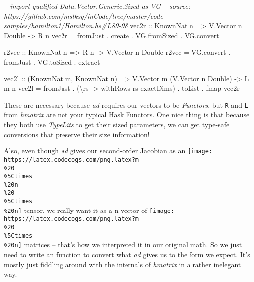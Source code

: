 \documentclass[]{article}
\newenvironment{Shaded}{}{}
\newcommand{\DataTypeTok}[1]{\textcolor[rgb]{0.56,0.13,0.00}{#1}}
\newcommand{\CommentTok}[1]{\textcolor[rgb]{0.38,0.63,0.69}{\textit{#1}}}
\newcommand{\OtherTok}[1]{\textcolor[rgb]{0.00,0.44,0.13}{#1}}
\newcommand{\FunctionTok}[1]{\textcolor[rgb]{0.02,0.16,0.49}{#1}}
\newcommand{\NormalTok}[1]{#1}
\begin{document}
\begin{Shaded}
\begin{Highlighting}[]
\CommentTok{-- import qualified Data.Vector.Generic.Sized as VG}
\CommentTok{-- source: https://github.com/mstksg/inCode/tree/master/code-samples/hamilton1/Hamilton.hs#L89-98}
\OtherTok{vec2r ::} \DataTypeTok{KnownNat}\NormalTok{ n }\OtherTok{=>} \DataTypeTok{V.Vector}\NormalTok{ n }\DataTypeTok{Double} \OtherTok{->} \DataTypeTok{R}\NormalTok{ n}
\NormalTok{vec2r }\FunctionTok{=}\NormalTok{ fromJust }\FunctionTok{.}\NormalTok{ create }\FunctionTok{.}\NormalTok{ VG.fromSized }\FunctionTok{.}\NormalTok{ VG.convert}

\OtherTok{r2vec ::} \DataTypeTok{KnownNat}\NormalTok{ n }\OtherTok{=>} \DataTypeTok{R}\NormalTok{ n }\OtherTok{->} \DataTypeTok{V.Vector}\NormalTok{ n }\DataTypeTok{Double}
\NormalTok{r2vec }\FunctionTok{=}\NormalTok{ VG.convert }\FunctionTok{.}\NormalTok{ fromJust }\FunctionTok{.}\NormalTok{ VG.toSized }\FunctionTok{.}\NormalTok{ extract}

\OtherTok{vec2l ::}\NormalTok{ (}\DataTypeTok{KnownNat}\NormalTok{ m, }\DataTypeTok{KnownNat}\NormalTok{ n) }\OtherTok{=>} \DataTypeTok{V.Vector}\NormalTok{ m (}\DataTypeTok{V.Vector}\NormalTok{ n }\DataTypeTok{Double}\NormalTok{) }\OtherTok{->} \DataTypeTok{L}\NormalTok{ m n}
\NormalTok{vec2l }\FunctionTok{=}\NormalTok{ fromJust }\FunctionTok{.}\NormalTok{ (\textbackslash{}rs }\OtherTok{->}\NormalTok{ withRows rs exactDims) }\FunctionTok{.}\NormalTok{ toList }\FunctionTok{.}\NormalTok{ fmap vec2r}
\end{Highlighting}
\end{Shaded}

These are necessary because \emph{ad} requires our vectors to be
\emph{Functors}, but \texttt{R} and \texttt{L} from \emph{hmatrix} are not your
typical Hask Functors. One nice thing is that because they both use
\emph{TypeLits} to get their sized parameters, we can get type-safe conversions
that preserve their size information!

Also, even though \emph{ad} gives our second-order Jacobian as an
\texttt{[image: https://latex.codecogs.com/png.latex?m\\\%20\\\%5Ctimes\\\%20n\\\%20\\\%5Ctimes\\\%20n]}
tensor, we really want it as a n-vector of
\texttt{[image: https://latex.codecogs.com/png.latex?m\\\%20\\\%5Ctimes\\\%20n]}
matrices -- that's how we interpreted it in our original math. So we just need
to write an function to convert what \emph{ad} gives us to the form we expect.
It's mostly just fiddling around with the internals of \emph{hmatrix} in a
rather inelegant way.
\end{document}
